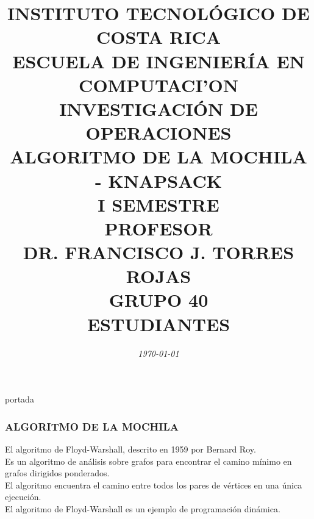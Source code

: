 \documentclass[10]{beamer}
\title{{\color{WHITE} \large \textbf{INSTITUTO TECNOL\'OGICO DE COSTA RICA}} \\ \vspace{0.02cm} 
{\color{WHITE} \large \textbf{ESCUELA DE INGENIER\'IA EN COMPUTACI'ON }} \\ \vspace{0.02cm} 
{\color{WHITE} \large \textbf{INVESTIGACI\'ON DE OPERACIONES  }} \\ \vspace{0.02cm} 
{\color{WHITE} \large \textbf{ALGORITMO DE LA MOCHILA - KNAPSACK  }} \\ \vspace{0.02cm} 
{\color{WHITE} \large \textbf{I SEMESTRE  }}\\ \vspace{0.02cm}
{\color{WHITE} \large \textbf{PROFESOR}} \\ \vspace{0.02cm}
{\color{WHITE} \large DR. FRANCISCO J. TORRES ROJAS  } \\ \vspace{0.02cm}
{\color{WHITE} \large \textbf{GRUPO 40}} \\ \vspace{0.01cm}
{\color{WHITE} \large \textbf{ESTUDIANTES} }}
\date{\em \color{WHITE} \today}
\begin{document}
\begin{frame}
\color{white}
\titlepage portada
\end{frame} 
\begin{frame}
\color{white}
\frametitle{ALGORITMO DE LA MOCHILA}
El algoritmo de Floyd-Warshall, descrito en 1959 por Bernard Roy.
\\Es un algoritmo de análisis sobre grafos para encontrar el camino mínimo en grafos dirigidos ponderados.
\\El algoritmo encuentra el camino entre todos los pares de vértices en una única ejecución.
\\ El algoritmo de Floyd-Warshall es un ejemplo de programación dinámica.
\end{frame} 
\end{document}
